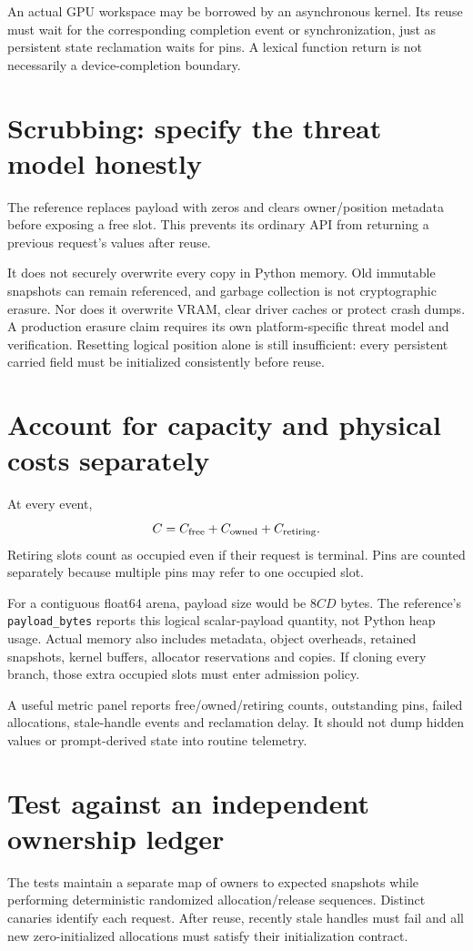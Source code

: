 An actual GPU workspace may be borrowed by an asynchronous kernel. Its reuse
must wait for the corresponding completion event or synchronization, just as
persistent state reclamation waits for pins. A lexical function return is not
necessarily a device-completion boundary.

\section{Scrubbing: specify the threat model honestly}
The reference replaces payload with zeros and clears owner/position metadata
before exposing a free slot. This prevents its ordinary API from returning a
previous request's values after reuse.

It does not securely overwrite every copy in Python memory. Old immutable
snapshots can remain referenced, and garbage collection is not cryptographic
erasure. Nor does it overwrite VRAM, clear driver caches or protect crash dumps.
A production erasure claim requires its own platform-specific threat model and
verification. Resetting logical position alone is still insufficient: every
persistent carried field must be initialized consistently before reuse.

\section{Account for capacity and physical costs separately}
At every event,
\[
 C=C_{\rm free}+C_{\rm owned}+C_{\rm retiring}.
\]
Retiring slots count as occupied even if their request is terminal.
Pins are counted separately because multiple pins may refer to one occupied
slot.

For a contiguous float64 arena, payload size would be $8CD$ bytes.
The reference's \texttt{payload\_bytes} reports this logical scalar-payload
quantity, not Python heap usage. Actual memory also includes metadata, object
overheads, retained snapshots, kernel buffers, allocator reservations and copies.
If cloning every branch, those extra occupied slots must enter admission policy.

A useful metric panel reports free/owned/retiring counts, outstanding pins,
failed allocations, stale-handle events and reclamation delay. It should not
dump hidden values or prompt-derived state into routine telemetry.

\section{Test against an independent ownership ledger}
The tests maintain a separate map of owners to expected snapshots while
performing deterministic randomized allocation/release sequences. Distinct
canaries identify each request. After reuse, recently stale handles must fail
and all new zero-initialized allocations must satisfy their initialization
contract.

